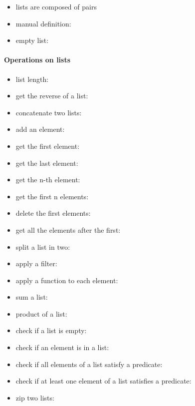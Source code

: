 \documentclass[a4paper,landscape,10pt]{article}
\begin{document}
\begin{multicols*}{2}
  \begin{itemize}
    \item lists are composed of pairs
    \item manual definition: \ihaskell{[1, 2, 3]}
    \item empty list: \ihaskell{[]}
  \end{itemize}

  \paragraph{Operations on lists}

  \begin{itemize}

    \item list length: 
    \item get the reverse of a list: 
    \item concatenate two lists: 
    \item add an element: 
    \item get the first element: 
    \item get the last element: 
    \item get the n-th element: 
    \item get the first n elements: 
    \item delete the first  elements: 
    \item get all the elements after the first: 
    \item split a list in two: 
    \item apply a filter: 
    \item apply a function to each element: 
    \item sum a list: 
    \item product of a list: 
    \item check if a list is empty: 
    \item check if an element is in a list: 
    \item check if all elements of a list satisfy a predicate: 
    \item check if at least one element of a list satisfies a predicate: 
    \item zip two lists: 
  \end{itemize}


\end{multicols*}
\end{document}
